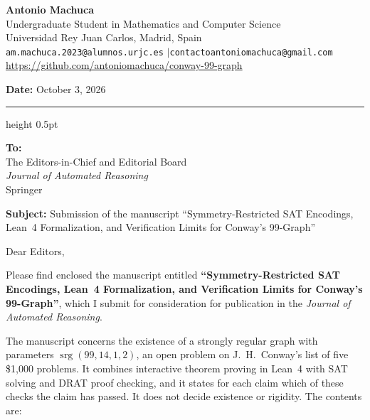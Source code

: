 \documentclass[10pt,a4paper]{article}
\begin{document}
\begin{minipage}[t]{0.72\textwidth}
  {\large\textbf{Antonio Machuca}} \\[1.5pt]
  Undergraduate Student in Mathematics and Computer Science \\
  Universidad Rey Juan Carlos, Madrid, Spain \\[1.5pt]
  {\small\texttt{am.machuca.2023@alumnos.urjc.es} \enspace$|$\enspace \texttt{contactoantoniomachuca@gmail.com}} \\
  \url{https://github.com/antoniomachuca/conway-99-graph}
\end{minipage}
\hfill
\begin{minipage}[t]{0.26\textwidth}
  \raggedleft
  \textbf{Date:} October 3, 2026
\end{minipage}

\vspace{0.4em}
\hrule height 0.5pt
\vspace{0.4em}

\textbf{To:} \\
The Editors-in-Chief and Editorial Board \\
\textit{Journal of Automated Reasoning} \\
Springer

\vspace{0.4em}
\textbf{Subject:} Submission of the manuscript ``Symmetry-Restricted SAT Encodings, Lean~4 Formalization, and Verification Limits for Conway's 99-Graph''
\vspace{0.4em}

Dear Editors,

Please find enclosed the manuscript entitled \textbf{``Symmetry-Restricted SAT Encodings, Lean~4 Formalization, and Verification Limits for Conway's 99-Graph''}, which I submit for consideration for publication in the \textit{Journal of Automated Reasoning}.

The manuscript concerns the existence of a strongly regular graph with parameters $\operatorname{srg}(99, 14, 1, 2)$, an open problem on J.~H.~Conway's list of five \$1{,}000 problems. It combines interactive theorem proving in Lean~4 with SAT solving and DRAT proof checking, and it states for each claim which of these checks the claim has passed. It does not decide existence or rigidity. The contents are:
\end{document}
